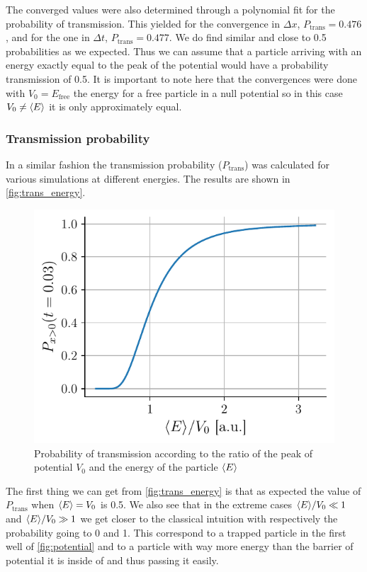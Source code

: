 The converged values were also determined through a polynomial fit for the probability of transmission. This yielded for the convergence in $\Delta x$, $P_\mathrm{trans} = 0.476$, and for the one in $\Delta t$, $P_\mathrm{trans} = 0.477$. We do find similar and close to 0.5 probabilities as we expected. Thus we can assume that a particle arriving with an energy exactly equal to the peak of the potential would have a probability transmission of 0.5. It is important to note here that the convergences were done with $V_0 = E_\mathrm{free}$ the energy for a free particle in a null potential so in this case $V_0 \neq \langle E \rangle$ it is only approximately equal.

\subsubsection{Transmission probability}
In a similar fashion the transmission probability ($P_\mathrm{trans}$) was calculated for various simulations at different energies. The results are shown in \autoref{fig:trans_energy}.
\begin{figure}[h]
    \centering
    \includegraphics[width = 0.6\linewidth]{figures/energy_probtrans.pdf}
    \caption{Probability of transmission according to the ratio of the peak of potential $V_0$ and the energy of the particle $\langle E \rangle$}
    \label{fig:trans_energy}
\end{figure}

The first thing we can get from \autoref{fig:trans_energy} is that as expected the value of $P_\mathrm{trans}$ when $\langle E \rangle = V_0$ is 0.5. We also see that in the extreme cases $\langle E \rangle/V_0 \ll 1$ and $\langle E \rangle/V_0 \gg 1$ we get closer to the classical intuition with respectively the probability going to 0 and 1. This correspond to a trapped particle in the first well of \autoref{fig:potential} and to a particle with way more energy than the barrier of potential it is inside of and thus passing it easily.





